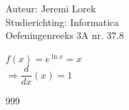 \documentclass[a4paper]{article}
\begin{document}
  
\noindent \large Auteur: Jeremi Lorek\\
\noindent \large Studierichting: Informatica\\
\noindent \large Oefeningenreeks 3A nr. 37.8\\

\medskip
\normalsize

$f(x) = e^{\ln x} = x$  \\

$\Rightarrow \dfrac{d}{dx} (x) = 1$  \\

\begin{thebibliography}{999}
\end{thebibliography}
\end{document}
